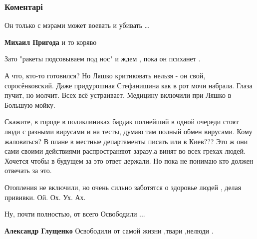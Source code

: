  
 
 
 
 
\subsubsection{Коментарі}
\label{sec:22_10_2021.fb.goldarb_maksim.1.statistika_zelenskii.cmt}

\begin{itemize} %

Он только с мэрами может воевать и убивать …

\begin{itemize} %
\textbf{Михаил Пригода} и то коряво
\end{itemize} %

Зато "ракеты подсовываем под нос" и ждем , пока он психанет .


А что, кто-то готовился? Но Ляшко критиковать нельзя - он свой, соросёнковский.
Даже придурошная Стефанишина как в рот мочи набрала. Глаза пучит, но молчит.
Всех всё устраивает. Медицину включили при Ляшко в Большую мойку.



Скажите, в городе в поликлиниках бардак полнейший в одной очереди стоят люди с
разными вирусами и на тесты, думаю там полный обмен вирусами. Кому жаловаться?
В плане в местные департаменты писать или в Киев??? Это ж они сами своими
действиями распространяют заразу.а винят во всех грехах людей. Хочется чтобы в
будущем за это ответ держали. Но пока не понимаю кто должен отвечать за это.


Отопления не включили, но очень сильно заботятся о здоровье людей , делая
прививки.  Ой. Ох. Ух. Ах.


Ну, почти полностью, от всего Освободили ...

\begin{itemize} %
\textbf{Александр Глущенко} Освободили от самой жизни ,твари ,нелюди .


\end{itemize}
\end{itemize}
